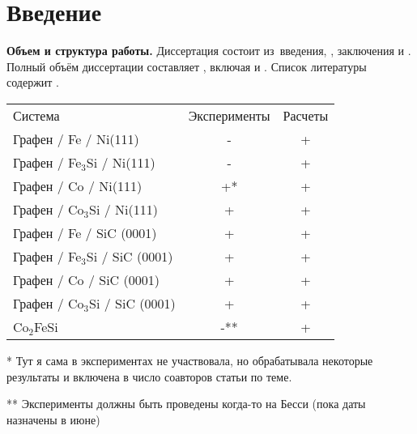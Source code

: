 \chapter*{Введение}                         %

\newcommand{\actuality}{}
\newcommand{\progress}{}
\newcommand{\aim}{{\textbf\aimTXT}}
\newcommand{\tasks}{\textbf{\tasksTXT}}
\newcommand{\novelty}{\textbf{\noveltyTXT}}
\newcommand{\influence}{\textbf{\influenceTXT}}
\newcommand{\methods}{\textbf{\methodsTXT}}
\newcommand{\defpositions}{\textbf{\defpositionsTXT}}
\newcommand{\reliability}{\textbf{\reliabilityTXT}}
\newcommand{\probation}{\textbf{\probationTXT}}
\newcommand{\contribution}{\textbf{\contributionTXT}}
\newcommand{\publications}{\textbf{\publicationsTXT}}


\textbf{Объем и структура работы.} Диссертация состоит из~введения,
,
заключения и
.
%
Полный объём диссертации составляет
, включая
 и
.
Список литературы содержит
.

\begin{tabular}{l|c|c}
Система & Эксперименты & Расчеты \\
Графен / Fe / Ni(111) & - & + \\
Графен / Fe$_3$Si / Ni(111) & - & + \\
Графен / Co / Ni(111) & +* & + \\
Графен / Co$_3$Si / Ni(111) & + & + \\
Графен / Fe / SiC (0001) & + & + \\
Графен / Fe$_3$Si / SiC (0001) & + & + \\
Графен / Co / SiC (0001) & + & + \\
Графен / Co$_3$Si / SiC (0001) & + & + \\
Co$_2$FeSi & -** & + \\
\hline

\end{tabular}

* Тут я сама в экспериментах не участвовала, но обрабатывала некоторые результаты и включена в число соавторов статьи по теме.

** Эксперименты должны быть проведены когда-то на Бесси (пока даты назначены в июне)